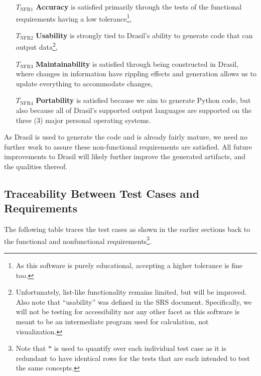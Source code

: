 \documentclass[12pt, titlepage]{article}
\begin{document}
\begin{enumerate}

    \item[$T_\text{NFR1}$] \textbf{Accuracy} is satisfied primarily through the
                tests of the functional requirements having a low
                tolerance\footnote{As this software is purely educational,
                accepting a higher tolerance is fine too.},

    \item[$T_\text{NFR2}$] \textbf{Usability} is strongly tied to Drasil's
                ability to generate code that can output
                data\footnote{Unfortunately, list-like functionality remains
                limited, but will be improved. Also note that ``usability'' was
                defined in the SRS document. Specifically, we will not be
                testing for accessibility nor any other facet as this software
                is meant to be an intermediate program used for calculation, not
                visualization.},

    \item[$T_\text{NFR3}$] \textbf{Maintainability} is satisfied through being
                constructed in Drasil, where changes in information have
                rippling effects and generation allows us to update everything
                to accommodate changes,

    \item[$T_\text{NFR4}$] \textbf{Portability} is satisfied because we aim to
                generate Python code, but also because all of Drasil's supported
                output languages are supported on the three (3) major personal
                operating systems.

\end{enumerate}

As Drasil is used to generate the code and is already fairly mature, we need no
further work to assure these non-functional requirements are satisfied. All
future improvements to Drasil will likely further improve the generated
artifacts, and the qualities thereof.

\subsection{Traceability Between Test Cases and Requirements}

The following table traces the test cases as shown in the earlier sections back
to the functional and nonfunctional requirements\footnote{Note that $*$ is used
to quantify over each individual test case as it is redundant to have identical
rows for the tests that are each intended to test the same concepts.}.
\end{document}
